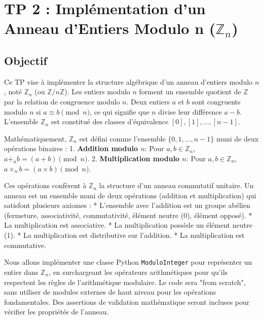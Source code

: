 \documentclass{report}
\begin{document}
\chapter*{TP 2 : Implémentation d'un Anneau d'Entiers Modulo n ($\mathbb{Z}_n$)}

\section*{Objectif}
Ce TP vise à implémenter la structure algébrique d'un anneau d'entiers modulo $n$, noté $\mathbb{Z}_n$ (ou $\mathbb{Z}/n\mathbb{Z}$). Les entiers modulo $n$ forment un ensemble quotient de $\mathbb{Z}$ par la relation de congruence modulo $n$. Deux entiers $a$ et $b$ sont congruents modulo $n$ si $a \equiv b \pmod n$, ce qui signifie que $n$ divise leur différence $a-b$. L'ensemble $\mathbb{Z}_n$ est constitué des classes d'équivalence $[0], [1], \dots, [n-1]$.

Mathématiquement, $\mathbb{Z}_n$ est défini comme l'ensemble $\{0, 1, \dots, n-1\}$ muni de deux opérations binaires :
1.  \textbf{Addition modulo $n$}: Pour $a, b \in \mathbb{Z}_n$, $a +_n b = (a+b) \pmod n$.
2.  \textbf{Multiplication modulo $n$}: Pour $a, b \in \mathbb{Z}_n$, $a \times_n b = (a \times b) \pmod n$.

Ces opérations confèrent à $\mathbb{Z}_n$ la structure d'un anneau commutatif unitaire. Un anneau est un ensemble muni de deux opérations (addition et multiplication) qui satisfont plusieurs axiomes :
*   L'ensemble avec l'addition est un groupe abélien (fermeture, associativité, commutativité, élément neutre (0), élément opposé).
*   La multiplication est associative.
*   La multiplication possède un élément neutre (1).
*   La multiplication est distributive sur l'addition.
*   La multiplication est commutative.

Nous allons implémenter une classe Python \texttt{ModuloInteger} pour représenter un entier dans $\mathbb{Z}_n$, en surchargeant les opérateurs arithmétiques pour qu'ils respectent les règles de l'arithmétique modulaire. Le code sera "from scratch", sans utiliser de modules externes de haut niveau pour les opérations fondamentales. Des assertions de validation mathématique seront incluses pour vérifier les propriétés de l'anneau.
\end{document}
